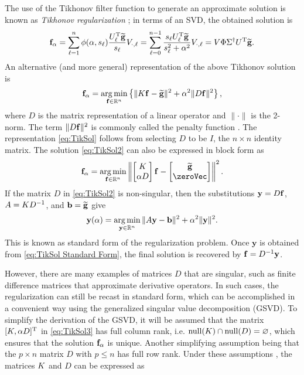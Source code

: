 The use of the Tikhonov filter function to generate an approximate solution is known as \textit{Tikhonov regularization} \cite{Tikh1963}; in terms of an SVD, the obtained solution is
\begin{equation}
\mathbf{f}_\alpha = \sum_{\ell = 1}^n \phi(\alpha,s_\ell)\frac{{U^{\mathrm{T}}_\ell}\widetilde{\mathbf{g}}}{s_\ell}V_{\cdot,\ell} = \sum_{\ell = 0}^{n-1} \frac{s_\ell{U^{\mathrm{T}}_\ell}\widetilde{\mathbf{g}}}{s_\ell^2 + \alpha^2}V_{\cdot,\ell} = V\Phi\Sigma^\dagger U^{\mathrm{T}}\widetilde{\mathbf{g}}.
\label{eq:TikSol}
\end{equation}
An alternative (and more general) representation of the above Tikhonov solution is
\begin{equation}
\mathbf{f}_\alpha = \operatorname*{arg\,min}_{\mathbf{f} \in \mathbb{R}^n} \left\{\|K\mathbf{f} - \widetilde{\mathbf{g}}\|^2 + \alpha^2\|D\mathbf{f}\|^2\right\},
\label{eq:TikSol2}
\end{equation}
where $D$ is the matrix representation of a linear operator and $\|\cdot\|$ is the 2-norm. The term $\|D\mathbf{f}\|^2$ is commonly called the penalty function \cite{Vogel:2002}. The representation \eqref{eq:TikSol} follows from selecting $D$ to be $I$, the $n \times n$ identity matrix. The solution \eqref{eq:TikSol2} can also be expressed in block form as
\begin{equation}
\fVec_\regparam = \argmin_{\fVec \in \mathbb{R}^n} \left\| \begin{bmatrix}
\kMat \\
\regparam D
\end{bmatrix}\fVec - \begin{bmatrix}
\gnoiseVec \\
\zeroVec
\end{bmatrix} \right\|^2.
\label{eq:TikSol3}
\end{equation}
If the matrix $D$ in \eqref{eq:TikSol2} is non-singular, then the substitutions $\mathbf{y} = D\mathbf{f}$, $A = K{D}^{-1}$, and $\mathbf{b} = \widetilde{\mathbf{g}}$ give
\begin{equation}
\mathbf{y}(\alpha) = \operatorname*{arg\,min}_{\mathbf{y} \in \mathbb{R}^n} \|A\mathbf{y} - \mathbf{b}\|^2 + \alpha^2\|\mathbf{y}\|^2.
\label{eq:TikSol Standard Form}
\end{equation}
This is known as standard form of the regularization problem. Once $\mathbf{y}$ is obtained from \eqref{eq:TikSol Standard Form}, the final solution is recovered by $\mathbf{f} = D^{-1}\mathbf{y}$.  \par 
However, there are many examples of matrices $D$ that are singular, such as finite difference matrices that approximate derivative operators. In such cases, the regularization can still be recast in standard form, which can be accomplished in a convenient way using the generalized singular value decomposition (GSVD). To simplify the derivation of the GSVD, it will be assumed that the matrix $[K, \alpha D]^{\mathrm{T}}$ in \eqref{eq:TikSol3} has full column rank, i.e. $\operatorname{null}(K) \cap \operatorname{null}(D) = \varnothing$, which ensures that the solution $\mathbf{f}_\alpha$ is unique. Another simplifying assumption being that the $p \times n$ matrix $D$ with $p \leq n$ has full row rank. Under these assumptions \cite[p.~104]{ABT}, the matrices $K$ and $D$ can be expressed as
